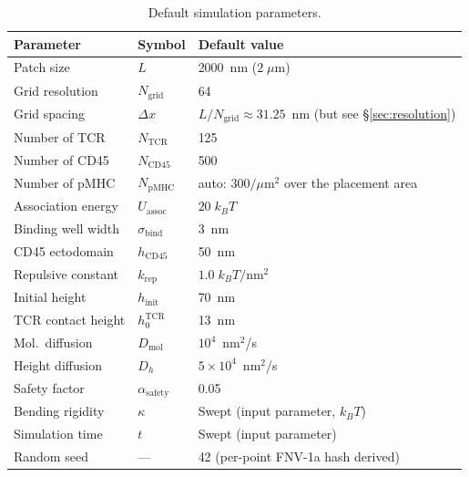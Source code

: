 \documentclass[11pt,a4paper]{article}
\begin{document}
\begin{table}[ht]
  \centering
  \caption{Default simulation parameters.}
  \label{tab:params}
  \begin{tabular}{@{}lll@{}}
    \toprule
    \textbf{Parameter} & \textbf{Symbol} & \textbf{Default value} \\
    \midrule
    Patch size          & $L$                   & 2000~nm ($2\;\mu$m) \\
    Grid resolution     & $N_\text{grid}$       & 64 \\
    Grid spacing        & $\Delta x$            & $L / N_\text{grid} \approx 31.25$~nm
                                                  (but see \S\ref{sec:resolution}) \\
    Number of TCR       & $N_\text{TCR}$        & 125 \\
    Number of CD45      & $N_\text{CD45}$       & 500 \\
    Number of pMHC      & $N_\text{pMHC}$       & auto: $300/\mu$m$^2$ over the
                                                  placement area \\
    Association energy  & $U_\text{assoc}$      & $20\;k_BT$ \\
    Binding well width  & $\sigma_\text{bind}$  & 3~nm \\
    CD45 ectodomain     & $h_\text{CD45}$       & 50~nm \\
    Repulsive constant  & $k_\text{rep}$        & $1.0\;k_BT/\text{nm}^2$ \\
    Initial height      & $h_\text{init}$       & 70~nm \\
    TCR contact height  & $h_0^\text{TCR}$      & 13~nm \\
    Mol.\ diffusion     & $D_\text{mol}$        & $10^4$~nm$^2$/s \\
    Height diffusion    & $D_h$                 & $5\times10^4$~nm$^2$/s \\
    Safety factor       & $\alpha_\text{safety}$ & 0.05 \\
    Bending rigidity    & $\kappa$              & Swept (input parameter, $k_BT$) \\
    Simulation time     & $t$                   & Swept (input parameter) \\
    Random seed         & ---                   & 42 (per-point FNV-1a hash derived) \\
    \bottomrule
  \end{tabular}
\end{table}
\end{document}
